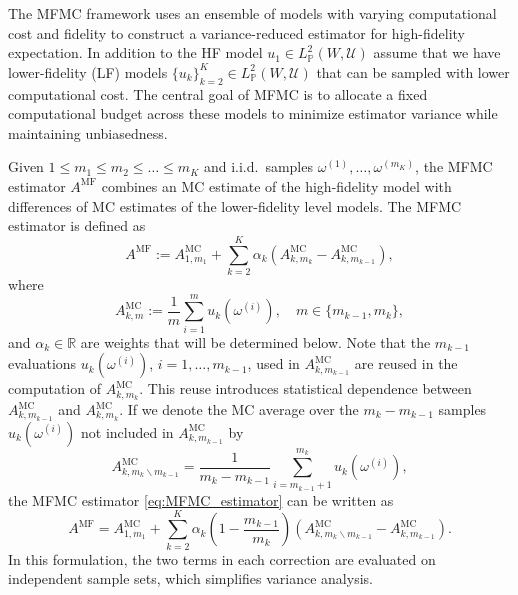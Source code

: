 The MFMC framework uses an ensemble of models with varying computational cost and fidelity 
to construct a variance-reduced estimator for high-fidelity expectation. 
In addition to the HF model $u_1 \in   L_{\mathbb{P}}^2(W, {\mathcal U})$ assume that we have lower-fidelity (LF) models
$\{u_k\}_{k=2}^K \in   L_{\mathbb{P}}^2(W, {\mathcal U})$ that can be sampled with lower computational cost.
The central goal of MFMC is to allocate a fixed computational budget across these models to minimize estimator variance while maintaining unbiasedness.

Given $1 \le m_1 \le m_2 \le \ldots \le m_K$ and i.i.d.\ samples $\omega^{(1)}, \ldots, \omega^{(m_K)}$,
the MFMC estimator $A^{\text{MF}}$ combines an MC estimate of the high-fidelity model with differences 
of MC estimates of the lower-fidelity level models.
The MFMC estimator is defined as
\begin{equation}\label{eq:MFMC_estimator}
    A^{\text{MF}}
     := A^{\text{MC}}_{1,m_1} + \sum_{k=2}^K \alpha_k\left(A^{\text{MC}}_{k,m_k} - A^{\text{MC}}_{k,m_{k-1}} \right),
\end{equation}
where
\begin{equation}\label{eq:MFMC_estimator_MCk}
     A^{\text{MC}}_{k,m} :=  \frac{1}{m} \sum_{i=1}^m   u_k(\omega^{(i)}), \quad m \in \{ m_{k-1}, m_k \},
\end{equation}
and $\alpha_k\in \mathbb{R}$ are weights that will be determined below.
Note that the $m_{k-1}$ evaluations $u_k(\omega^{(i)})$, $i = 1, \ldots,  m_{k-1}$,
used in  $A^{\text{MC}}_{k,m_{k-1}}$ are reused in  the computation of $A^{\text{MC}}_{k,m_k}$.
This reuse introduces statistical dependence between 
$A^{\text{MC}}_{k,m_{k-1}}$ and $A^{\text{MC}}_{k,m_k}$. 
If we denote the MC average over the $m_k - m_{k-1}$ samples $u_k(\omega^{(i)})$ 
not included in $A^{\text{MC}}_{k,m_{k-1}}$ by
\[
     A^{\text{MC}}_{k,m_k \backslash m_{k-1}}
      =  \frac{1}{m_k-m_{k-1}}  \sum_{i=m_{k-1}+1}^{m_k}   u_k(\omega^{(i)}), 
\]
the MFMC estimator \eqref{eq:MFMC_estimator} can be written as
\begin{equation}\label{eq:MFMC_estimator_independent}
    A^{\text{MF}} 
    = A^{\text{MC}}_{1,m_1} 
      +  \sum_{k=2}^K \alpha_k\left(1-\frac{m_{k-1}}{m_k}\right)
                               \left(A_{k,m_k\backslash m_{k-1}}^{\text{MC}}-A_{k,m_{k-1}}^{\text{MC}}\right).
\end{equation}
In this formulation, the two terms in each correction are evaluated on independent sample sets, 
which simplifies variance analysis. 
